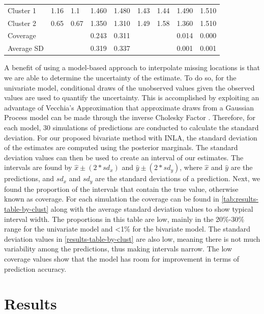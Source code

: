 \documentclass[12pt]{article}
\begin{document}
\begin{table}
\begin{tabular}[t]{lllrrllrr}
\hspace{1em}Cluster 1 & 1.16 & 1.1 & 1.460 & 1.480 & 1.43 & 1.44 & 1.490 & 1.510\\
\hspace{1em}Cluster 2 & 0.65 & 0.67 & 1.350 & 1.310 & 1.49 & 1.58 & 1.360 & 1.510\\
\hspace{1em}Coverage &  &  & 0.243 & 0.311 &  &  & 0.014 & 0.000\\
\hspace{1em}Average SD &  &  & 0.319 & 0.337 &  &  & 0.001 & 0.001\\
\bottomrule
\end{tabular}
\end{table}

A benefit of using a model-based approach to interpolate missing
locations is that we are able to determine the uncertainty of the
estimate. To do so, for the univariate model, conditional draws of the
unobserved values given the observed values are used to quantify the
uncertainty. This is accomplished by exploiting an advantage of
Vecchia's Approximation that approximate draws from a Gaussian Process
model can be made through the inverse Cholesky Factor
\citep{guinness_permutation_2018}. Therefore, for each model, 30
simulations of predictions are conducted to calculate the standard
deviation. For our proposed bivariate method with INLA, the standard
deviation of the estimates are computed using the posterior marginals.
The standard deviation values can then be used to create an interval of
our estimates. The intervals are found by \(\hat{x} \pm (2*sd_x)\) and
\(\hat{y} \pm (2*sd_y)\), where \(\hat{x}\) and \(\hat{y}\) are the
predictions, and \(sd_x\) and \(sd_y\) are the standard deviations of a
prediction. Next, we found the proportion of the intervals that contain
the true value, otherwise known as coverage. For each simulation the
coverage can be found in \cref{tab:results-table-by-clust} along with
the average standard deviation values to show typical interval width.
The proportions in this table are low, mainly in the 20\%-30\% range for
the univariate model and \textless1\% for the bivariate model. The
standard deviation values in \cref{results-table-by-clust} are also low,
meaning there is not much variability among the predictions, thus making
intervals narrow. The low coverage values show that the model has room
for improvement in terms of prediction accuracy.

\hypertarget{results}{%
\section{Results}\label{results}}
\end{document}
